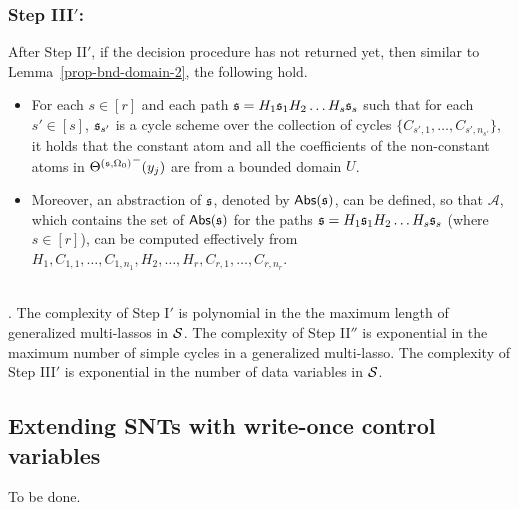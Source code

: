 \subsubsection{Step III$'$:}
After Step II$'$, if the decision procedure has not returned yet, then similar to Lemma~\ref{prop-bnd-domain-2}, the following hold.
\begin{itemize}
\item For each $s \in [r]$ and each path ${\mathfrak{s} }=H_1 {\mathfrak{s} }_1 H_2 \dots H_s {\mathfrak{s} }_s$ such that for each $s'\in [s]$, ${\mathfrak{s} }_{s'}$ is a cycle scheme over the collection of cycles $\{C_{s',1},\dots,C_{s',n_{s'}}\}$, it holds that the constant atom and all the coefficients of the non-constant atoms in ${\Theta^{({\mathfrak{s} },\Omega_0)}}^-(y_j)$ are from a bounded domain $U$.
%
\item Moreover,  an abstraction of ${\mathfrak{s} }$, denoted by $\mathsf{Abs}({\mathfrak{s} })$, can be defined, so that $\mathscr{A}$, which contains the set of $\mathsf{Abs}({\mathfrak{s} })$ for the paths ${\mathfrak{s} }=H_1 {\mathfrak{s} }_1 H_2 \dots H_s {\mathfrak{s} }_s$ (where $s \in [r]$), can be computed effectively from 
$H_1, C_{1,1}, \dots, C_{1,n_1},H_2,\dots, H_r,C_{r,1},\dots, C_{r,n_r}$.
\end{itemize}
\smallskip
{}\medskip\\

. The complexity of Step I$'$ is polynomial in the the maximum length of generalized multi-lassos in ${\mathcal{S} }$. The complexity of Step II$''$ is exponential in the maximum number of simple cycles in a generalized multi-lasso. The complexity of Step III$'$ is exponential in the number of data variables in ${\mathcal{S} }$.

\subsection{Extending SNTs with write-once control variables}

To be done.
